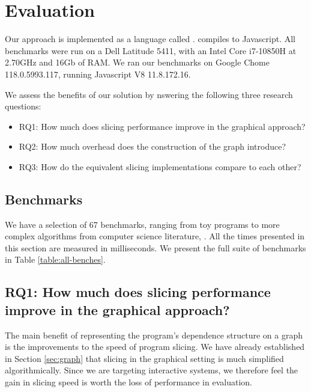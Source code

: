 \section{Evaluation}
\label{sec:evaluation}
Our approach is implemented as a language called \OurLang. \OurLang compiles to
Javascript. All benchmarks were run on a Dell Latitude 5411, with an Intel Core i7-10850H at
2.70GHz and 16Gb of RAM. We ran our benchmarks on Google Chome 118.0.5993.117,
running Javascript V8 11.8.172.16.

We assess the benefits of our solution by nswering the following three research questions:
\begin{itemize}
    \item RQ1: How much does slicing performance improve in the graphical approach?
    \item RQ2: How much overhead does the construction of the graph introduce?
    \item RQ3: How do the equivalent slicing implementations compare to each other?
\end{itemize}

\subsection{Benchmarks} \label{sec:benchmarks}
We have a selection of 67 benchmarks, ranging from toy programs to more complex
algorithms from computer science literature, .
All the times presented in this
section are measured in milliseconds. We present the full suite of benchmarks in 
Table \ref{table:all-benches}.

\subsection{RQ1: How much does slicing performance improve in the graphical approach?}
The main benefit of representing the program's dependence structure on a graph
is the improvements to the speed of program slicing. We have already established
in Section \ref{sec:graph} that slicing in the graphical setting is much simplified
algorithmically. Since we are targeting interactive systems, we therefore feel
the gain in slicing speed is worth the loss of performance in evaluation.

